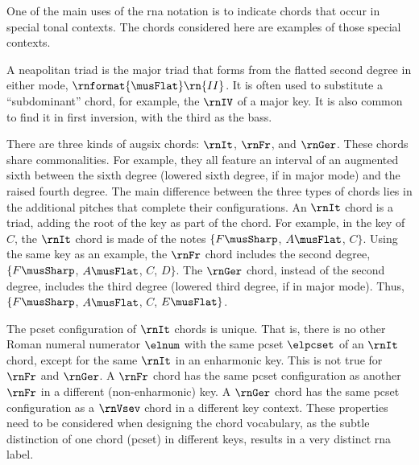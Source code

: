 
One of the main uses of the \gls{rna} notation is to
indicate chords that occur in special tonal contexts. The
chords considered here are examples of those special
contexts.


A \gls{neapolitan} triad is the major triad that forms from
the flatted second degree in either mode,
$\rnformat{\musFlat}\rn{II}$. It is often used to substitute
a ``subdominant'' chord, for example, the $\rnIV$ of a major
key. It is also common to find it in first inversion, with
the third as the bass.


There are three kinds of \gls{augsix} chords: $\rnIt$,
$\rnFr$, and $\rnGer$. These chords share commonalities. For
example, they all feature an interval of an augmented sixth
between the sixth degree (lowered sixth degree, if in major
mode) and the raised fourth degree. The main difference
between the three types of chords lies in the additional
pitches that complete their configurations. An $\rnIt$ chord
is a triad, adding the root of the key as part of the chord.
For example, in the key of $C$, the $\rnIt$ chord is made of
the notes $\{F\musSharp$, $A\musFlat$, $C\}$. Using the same
key as an example, the $\rnFr$ chord includes the second
degree, $\{F\musSharp$, $A\musFlat$, $C$, $D\}$. The
$\rnGer$ chord, instead of the second degree, includes the
third degree (lowered third degree, if in major mode). Thus,
$\{F\musSharp$, $A\musFlat$, $C$, $E\musFlat\}$.

The \gls{pcset} configuration of $\rnIt$ chords is unique.
That is, there is no other Roman numeral numerator $\elnum$
with the same \gls{pcset} $\elpcset$ of an $\rnIt$ chord,
except for the same $\rnIt$ in an enharmonic key. This is
not true for $\rnFr$ and $\rnGer$. A $\rnFr$ chord has the
same \gls{pcset} configuration as another $\rnFr$ in a
different (non-enharmonic) key. A $\rnGer$ chord has the
same \gls{pcset} configuration as a $\rnVsev$ chord in a
different key context. These properties need to be
considered when designing the chord vocabulary, as the
subtle distinction of one chord (\gls{pcset}) in different
keys, results in a very distinct \gls{rna} label.

